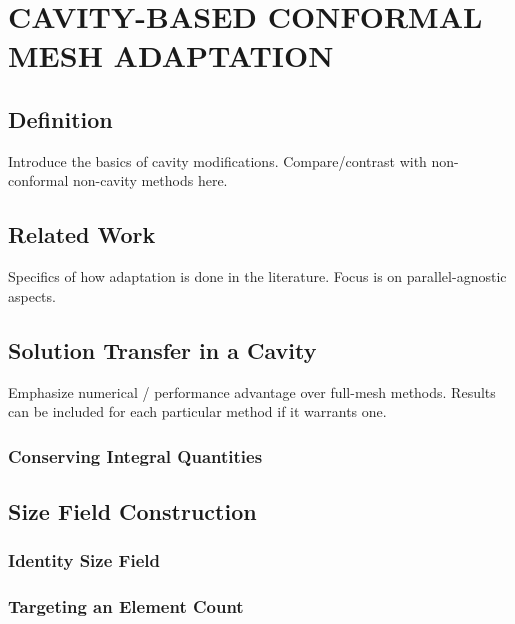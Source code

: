 
\chapter{CAVITY-BASED CONFORMAL MESH ADAPTATION}
\label{chap:adapt}

\section{Definition}

Introduce the basics of cavity modifications.
Compare/contrast with non-conformal non-cavity methods here.

\section{Related Work}

Specifics of how adaptation is done in the literature.
Focus is on parallel-agnostic aspects.

\section{Solution Transfer in a Cavity}

Emphasize numerical / performance advantage
over full-mesh methods.
Results can be included for each particular
method if it warrants one.

\subsection{Conserving Integral Quantities}

\section{Size Field Construction}

\subsection{Identity Size Field}

\subsection{Targeting an Element Count}

